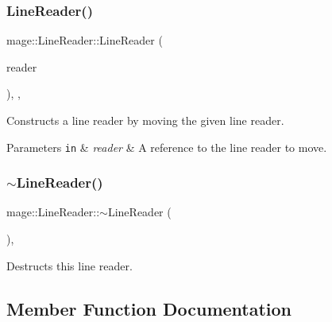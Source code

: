 \subsubsection{\texorpdfstring{Line\+Reader()}{LineReader()}\hspace{0.1cm}{\footnotesize\ttfamily [3/3]}}
{\footnotesize\ttfamily mage\+::\+Line\+Reader\+::\+Line\+Reader (\begin{DoxyParamCaption}\item[{\hyperlink{classmage_1_1_line_reader}{Line\+Reader} \&\&}]{reader }\end{DoxyParamCaption})\hspace{0.3cm}{\ttfamily [protected]}, {\ttfamily [default]}, {\ttfamily [noexcept]}}

Constructs a line reader by moving the given line reader.


\begin{DoxyParams}[1]{Parameters}
\mbox{\tt in}  & {\em reader} & A reference to the line reader to move. \\
\hline
\end{DoxyParams}
\hypertarget{classmage_1_1_line_reader_ad9753ea392ebe5b3867852d3392fb1e7}{}\label{classmage_1_1_line_reader_ad9753ea392ebe5b3867852d3392fb1e7} 
\subsubsection{\texorpdfstring{$\sim$\+Line\+Reader()}{~LineReader()}}
{\footnotesize\ttfamily mage\+::\+Line\+Reader\+::$\sim$\+Line\+Reader (\begin{DoxyParamCaption}{ }\end{DoxyParamCaption})\hspace{0.3cm}{\ttfamily [protected]}, {\ttfamily [default]}}

Destructs this line reader. 

\subsection{Member Function Documentation}
\hypertarget{classmage_1_1_line_reader_a3401db2b0ecd15d8048a1b321eceb77a}{}\label{classmage_1_1_line_reader_a3401db2b0ecd15d8048a1b321eceb77a} 
